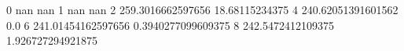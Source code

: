 0 nan nan
1 nan nan
2 259.3016662597656 18.68115234375
4 240.62051391601562 0.0
6 241.01454162597656 0.3940277099609375
8 242.5472412109375 1.926727294921875
